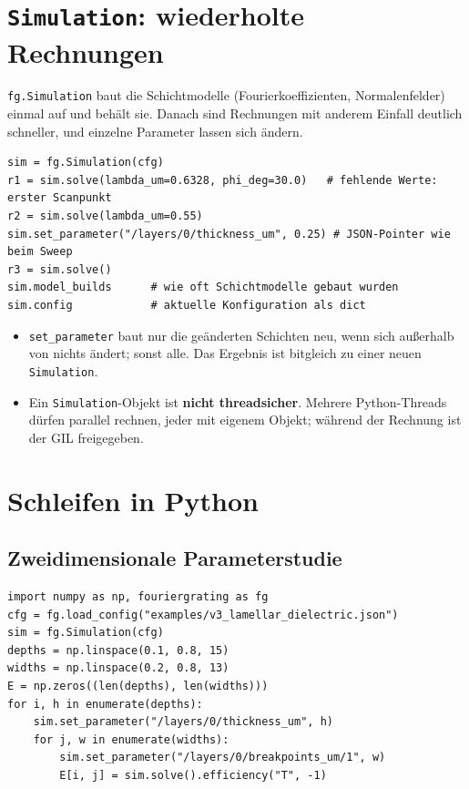 \section{\texttt{Simulation}: wiederholte Rechnungen}\label{sec:simulation}
\texttt{fg.Simulation} baut die Schichtmodelle (Fourierkoeffizienten, Normalenfelder) einmal auf und behält sie.
Danach sind Rechnungen mit anderem Einfall deutlich schneller, und einzelne Parameter lassen sich ändern.
\begin{lstlisting}[style=py]
sim = fg.Simulation(cfg)
r1 = sim.solve(lambda_um=0.6328, phi_deg=30.0)   # fehlende Werte: erster Scanpunkt
r2 = sim.solve(lambda_um=0.55)
sim.set_parameter("/layers/0/thickness_um", 0.25) # JSON-Pointer wie beim Sweep
r3 = sim.solve()
sim.model_builds      # wie oft Schichtmodelle gebaut wurden
sim.config            # aktuelle Konfiguration als dict
\end{lstlisting}
\begin{itemize}
  \item \texttt{set\_parameter} baut nur die geänderten Schichten neu, wenn sich außerhalb von  nichts
        ändert; sonst alle. Das Ergebnis ist bitgleich zu einer neuen \texttt{Simulation}.
  \item Ein \texttt{Simulation}-Objekt ist \textbf{nicht threadsicher}. Mehrere Python-Threads dürfen parallel
        rechnen, jeder mit eigenem Objekt; während der Rechnung ist der GIL freigegeben.
\end{itemize}

\section{Schleifen in Python}\label{sec:py-schleifen}
\subsection{Zweidimensionale Parameterstudie}
\begin{lstlisting}[style=py]
import numpy as np, fouriergrating as fg
cfg = fg.load_config("examples/v3_lamellar_dielectric.json")
sim = fg.Simulation(cfg)
depths = np.linspace(0.1, 0.8, 15)
widths = np.linspace(0.2, 0.8, 13)
E = np.zeros((len(depths), len(widths)))
for i, h in enumerate(depths):
    sim.set_parameter("/layers/0/thickness_um", h)
    for j, w in enumerate(widths):
        sim.set_parameter("/layers/0/breakpoints_um/1", w)
        E[i, j] = sim.solve().efficiency("T", -1)
\end{lstlisting}

